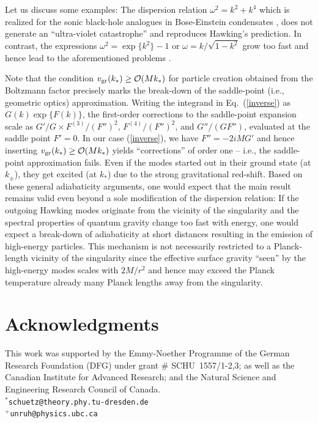 \documentclass[12pt,aps,prl,showpacs,amssymb,nofootinbib,onecolumn]{revtex4-2}
\newcommand{\ord}{{\cal O}}
\begin{document}
Let us discuss some examples:
%
The dispersion relation $\omega^2=k^2+k^4$ which is realized for the
sonic black-hole analogues in Bose-Einstein condensates \cite{garay},
does not generate an ``ultra-violet catastrophe'' and reproduces
Hawking's prediction. 
%
In contrast, the expressions $\omega^2=\exp\{k^2\}-1$ or 
$\omega=k/\sqrt{1-k^2}$ grow too fast and hence lead to the
aforementioned problems \cite{motiv}.  

Note that the condition $v_{\rm gr}(k_*)\geq\ord(Mk_*)$ for particle
creation obtained from the Boltzmann factor precisely marks the
break-down of the saddle-point (i.e., geometric optics)
approximation. 
%
Writing the integrand in Eq.~(\ref{inverse}) as $G(k)\exp\{F(k)\}$,
the first-order corrections to the saddle-point expansion scale as 
$G'/G \times F^{(3)}/(F'')^2$, $F^{(4)}/(F'')^2$, and $G''/(GF'')$,
evaluated at the saddle point $F'=0$. 
%
In our case (\ref{inverse}), we have $F''=-2iMG'$ and hence inserting 
$v_{\rm gr}(k_*)\geq\ord(Mk_*)$ yields ``corrections'' of order one --
i.e., the  saddle-point approximation fails. 
%
Even if the modes started out in their ground state (at $k_\pm$), they 
get excited (at $k_*$) due to the strong gravitational red-shift. 
%
Based on these general adiabaticity arguments, one would expect that
the main result remains valid even beyond a sole modification of the
dispersion relation:
%
If the outgoing Hawking modes originate from the vicinity of the
singularity and the spectral properties of quantum gravity change too
fast with energy, one would expect a break-down of adiabaticity at
short distances resulting in the emission of high-energy particles. 
%
This mechanism is not necessarily restricted to a Planck-length
vicinity of the singularity since the effective surface gravity
``seen'' by the high-energy modes scales with $2M/r^2$ and hence may
exceed the Planck temperature already many Planck lengths away from
the singularity. 

\section{Acknowledgments}\quad
%
This work was supported by the Emmy-Noether Programme of the German
Research Foundation (DFG) under grant \# SCHU~1557/1-2,3; as well as 
the Canadian Institute for Advanced Research; and the
Natural Science and Engineering Research Council of Canada. 
%
\\
$^*${\tt schuetz@theory.phy.tu-dresden.de}
\\
$^+${\tt unruh@physics.ubc.ca}
\end{document}
